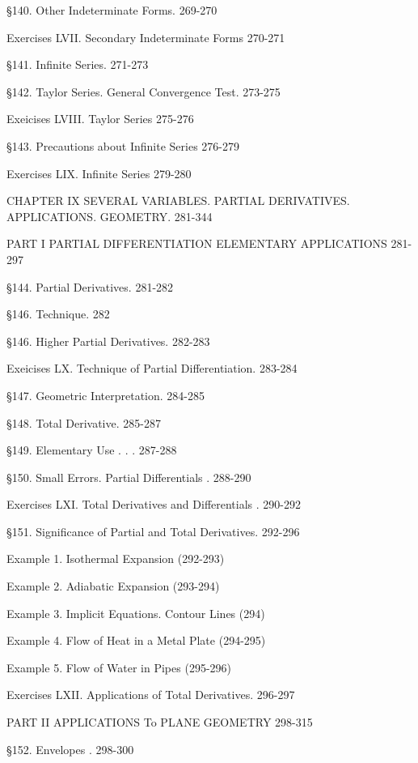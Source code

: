 \documentclass[12pt]{article}
\begin{document}
\S 140. Other Indeterminate Forms. 269-270

Exercises LVII. Secondary Indeterminate Forms 270-271

\S 141. Infinite Series. 271-273

\S 142. Taylor Series. General Convergence Test. 273-275

Exeicises LVIII. Taylor Series 275-276

\S 143. Precautions about Infinite Series 276-279

Exercises LIX. Infinite Series 279-280

CHAPTER IX SEVERAL VARIABLES. PARTIAL DERIVATIVES.
 APPLICATIONS. GEOMETRY. 281-344

\begin{center}
PART I PARTIAL DIFFERENTIATION ELEMENTARY APPLICATIONS 281-297
\end{center}

\S 144. Partial Derivatives. 281-282

\S 146. Technique. 282

\S 146. Higher Partial Derivatives. 282-283

Exeicises LX. Technique of Partial Differentiation. 283-284

\S 147. Geometric Interpretation. 284-285

\S 148. Total Derivative. 285-287


\S 149. Elementary Use . . . 287-288

\S 150. Small Errors. Partial Differentials . 288-290

Exercises LXI. Total Derivatives and Differentials . 290-292

\S 151. Significance of Partial and Total Derivatives. 292-296
\begin{center}
Example 1. Isothermal Expansion (292-293)

Example 2. Adiabatic Expansion (293-294)

Example 3. Implicit Equations. Contour Lines (294)

Example 4. Flow of Heat in a Metal Plate (294-295)

Example 5. Flow of Water in Pipes (295-296)
\end{center}

Exercises LXII. Applications of Total Derivatives. 296-297

\begin{center}
PART II APPLICATIONS To PLANE GEOMETRY 298-315
\end{center}
\S 152. Envelopes . 298-300
\end{document}
